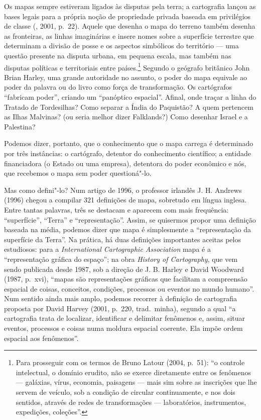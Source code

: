 Os mapas sempre estiveram ligados às disputas pela terra; a cartografia
lançou as bases legais para a própria noção de propriedade privada
baseada em privilégios de classe (, 2001, p.~22). Aquele que
desenha o mapa do terreno também desenha as fronteiras, as linhas
imaginárias e insere nomes sobre a superfície terrestre que determinam a
divisão de posse e os aspectos simbólicos do território --- uma questão
presente na disputa urbana, em pequena escala, mas também nas disputas
políticas e territoriais entre países.\footnote{Para prosseguir com os
  termos de Bruno Latour (2004, p.~51): ``o controle intelectual, o
  domínio erudito, não se exerce diretamente entre os fenômenos ---
  galáxias, vírus, economia, paisagens --- mais sim sobre as inscrições
  que lhe servem de veículo, sob a condição de circular continuamente, e
  nos dois sentidos, através de redes de transformações --- laboratórios,
  instrumentos, expedições, coleções''.} Segundo o geógrafo britânico
John Brian Harley, uma grande autoridade no assunto, o poder do mapa
equivale ao poder da palavra ou do livro como força de transformação. Os
cartógrafos ``fabricam poder'', criando um ``panóptico espacial''.
Afinal, onde traçar a linha do Tratado de Tordesilhas? Como separar a
Índia do Paquistão? A quem pertencem as Ilhas Malvinas? (ou seria melhor
dizer Falklands?) Como desenhar Israel e a Palestina?

Podemos dizer, portanto, que o conhecimento que o mapa carrega é
determinado por três instâncias: o cartógrafo, detentor do conhecimento
científico; a entidade financiadora (o Estado ou uma empresa), detentora do poder
econômico e nós, que recebemos o mapa sem poder questioná"-lo.

Mas como defini"-lo? Num artigo de 1996, o professor irlandês J. H.
Andrews (1996) chegou a compilar 321 definições de mapa, sobretudo em
língua inglesa. Entre tantas palavras, três se destacam e aparecem com
mais frequência: ``superfície'', ``Terra'' e ``representação''. Assim,
se quisermos propor uma definição baseada na média, podemos dizer que
mapa é simplesmente a ``representação da superfície da Terra''. Na
prática, há duas definições importantes aceitas pelos estudiosos: para a
\emph{International Cartographic Association} mapa é a
``representação gráfica do espaço''; na obra \emph{History of
Cartography}, que vem sendo publicada desde 1987, sob a direção de J. B.
Harley e David Woodward (1987, p.~xvi), ``mapas são representações
gráficas que facilitam a compreensão espacial de coisas, conceitos,
condições, processos ou eventos no mundo humano''. Num sentido ainda
mais amplo, podemos recorrer à definição de cartografia proposta por
David Harvey (2001, p.~220, trad.~minha), segundo a qual ``a cartografia \label{harvey}
trata de localizar, identificar e delimitar fenômenos e, assim, situar
eventos, processos e coisas numa moldura espacial coerente. Ela impõe
ordem espacial aos fenômenos''.

